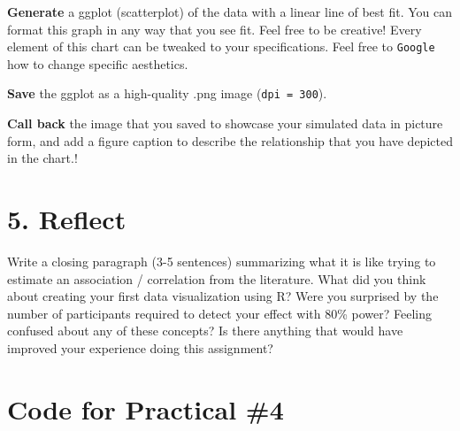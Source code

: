 \documentclass[
]{book}
\newenvironment{Shaded}{\begin{snugshade}}{\end{snugshade}}
\newcommand{\AttributeTok}[1]{\textcolor[rgb]{0.13,0.29,0.53}{#1}}
\newcommand{\CommentTok}[1]{\textcolor[rgb]{0.56,0.35,0.01}{\textit{#1}}}
\newcommand{\ConstantTok}[1]{\textcolor[rgb]{0.56,0.35,0.01}{#1}}
\newcommand{\DecValTok}[1]{\textcolor[rgb]{0.00,0.00,0.81}{#1}}
\newcommand{\FunctionTok}[1]{\textcolor[rgb]{0.13,0.29,0.53}{\textbf{#1}}}
\newcommand{\NormalTok}[1]{#1}
\newcommand{\SpecialCharTok}[1]{\textcolor[rgb]{0.81,0.36,0.00}{\textbf{#1}}}
\begin{document}
\textbf{Generate} a ggplot (scatterplot) of the data with a linear line of best fit. You can format this graph in any way that you see fit. Feel free to be creative! Every element of this chart can be tweaked to your specifications. Feel free to \texttt{Google} how to change specific aesthetics.

\textbf{Save} the ggplot as a high-quality .png image (\texttt{dpi\ =\ 300}).

\textbf{Call back} the image that you saved to showcase your simulated data in picture form, and add a figure caption to describe the relationship that you have depicted in the chart.!

\section*{5. Reflect}\label{reflect-3}

Write a closing paragraph (3-5 sentences) summarizing what it is like trying to estimate an association / correlation from the literature. What did you think about creating your first data visualization using R? Were you surprised by the number of participants required to detect your effect with 80\% power? Feeling confused about any of these concepts? Is there anything that would have improved your experience doing this assignment?

\section*{Code for Practical \#4}\label{code-for-practical-4}

\begin{Shaded}
\end{Shaded}
\end{document}
